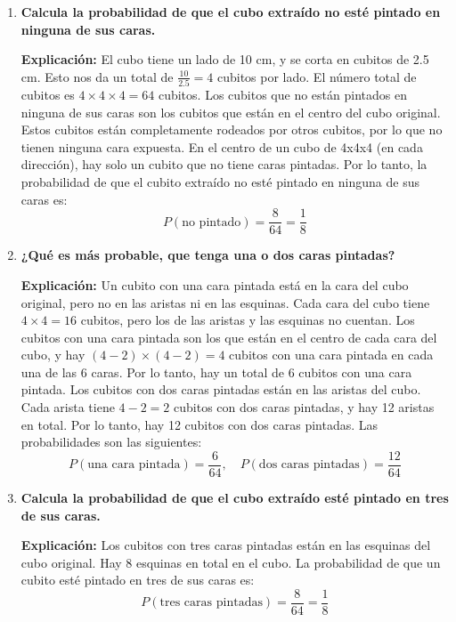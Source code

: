 \documentclass[titlepage]{article} %
\begin{document}
\begin{enumerate}
    \item \textbf{Calcula la probabilidad de que el cubo extraído no esté pintado en ninguna de sus caras.}
    
    \textbf{Explicación:}  
    El cubo tiene un lado de 10 cm, y se corta en cubitos de 2.5 cm. Esto nos da un total de \( \frac{10}{2.5} = 4 \) cubitos por lado. El número total de cubitos es \( 4 \times 4 \times 4 = 64 \) cubitos.  
    Los cubitos que no están pintados en ninguna de sus caras son los cubitos que están en el centro del cubo original. Estos cubitos están completamente rodeados por otros cubitos, por lo que no tienen ninguna cara expuesta. En el centro de un cubo de 4x4x4 (en cada dirección), hay solo un cubito que no tiene caras pintadas.  
    Por lo tanto, la probabilidad de que el cubito extraído no esté pintado en ninguna de sus caras es:
    \[
    P(\text{no pintado}) = \frac{8}{64} = \frac{1}{8}
    \]

    \item \textbf{¿Qué es más probable, que tenga una o dos caras pintadas?}
    
    \textbf{Explicación:}  
    Un cubito con una cara pintada está en la cara del cubo original, pero no en las aristas ni en las esquinas. Cada cara del cubo tiene \( 4 \times 4 = 16 \) cubitos, pero los de las aristas y las esquinas no cuentan.  
    Los cubitos con una cara pintada son los que están en el centro de cada cara del cubo, y hay \( (4-2) \times (4-2) = 4 \) cubitos con una cara pintada en cada una de las 6 caras. Por lo tanto, hay un total de 6 cubitos con una cara pintada.  
    Los cubitos con dos caras pintadas están en las aristas del cubo. Cada arista tiene \( 4-2 = 2 \) cubitos con dos caras pintadas, y hay 12 aristas en total. Por lo tanto, hay 12 cubitos con dos caras pintadas.
    Las probabilidades son las siguientes:
    \[
    P(\text{una cara pintada}) = \frac{6}{64}, \quad P(\text{dos caras pintadas}) = \frac{12}{64}
    \]

    \item \textbf{Calcula la probabilidad de que el cubo extraído esté pintado en tres de sus caras.}
    
    \textbf{Explicación:}  
    Los cubitos con tres caras pintadas están en las esquinas del cubo original. Hay 8 esquinas en total en el cubo. La probabilidad de que un cubito esté pintado en tres de sus caras es:
    \[
    P(\text{tres caras pintadas}) = \frac{8}{64} = \frac{1}{8}
    \]
\end{enumerate}
\end{document}
